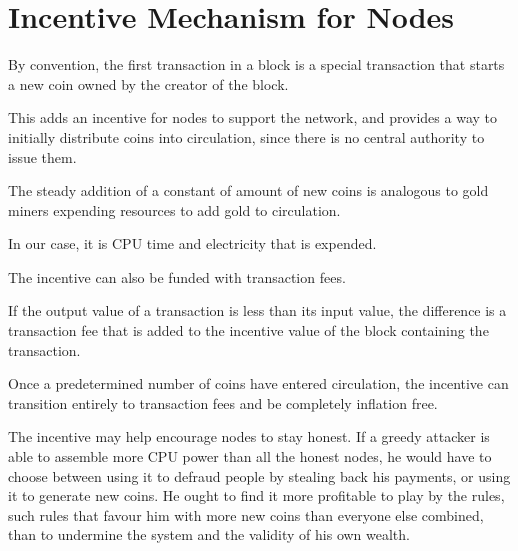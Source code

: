 \section{Incentive Mechanism for Nodes}

By convention, the first transaction in a block is a special transaction that starts a new coin owned by the creator of the block.

This adds an incentive for nodes to support the network, and provides a way to initially distribute coins into circulation, since there is no central authority to issue them.

The steady addition of a constant of amount of new coins is analogous to gold miners expending resources to add gold to circulation.

In our case, it is CPU time and electricity that is expended.

The incentive can also be funded with transaction fees.

If the output value of a transaction is less than its input value, the difference is a transaction fee that is added to the incentive value of the block containing the transaction.

Once a predetermined number of coins have entered circulation, the incentive can transition entirely to transaction fees and be completely inflation free.

The incentive may help encourage nodes to stay honest. If a greedy attacker is able to assemble more CPU power than all the honest nodes, he would have to choose between using it to defraud people by stealing back his payments, or using it to generate new coins. He ought to find it more profitable to play by the rules, such rules that favour him with more new coins than everyone else combined, than to undermine the system and the validity of his own wealth.